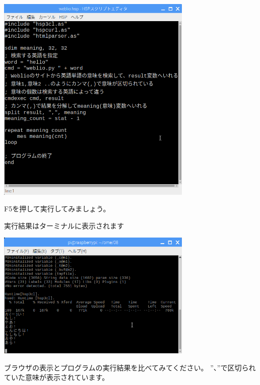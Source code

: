 \begin{center}
\includegraphics[width=0.7\textwidth]{./text08-img/textbook-img047.png}

\end{center}


\bigskip


F5を押して実行してみましょう。

実行結果はターミナルに表示されます



\begin{center}
\includegraphics[width=0.7\textwidth]{./text08-img/textbook-img048.png}

\end{center}

\bigskip

\clearpage


ブラウザの表示とプログラムの実行結果を比べてみてください。
”、”で区切られていた意味が表示されています。



